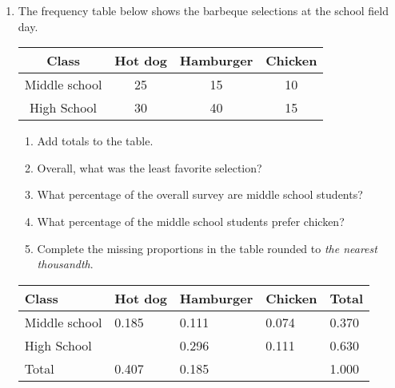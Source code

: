 \documentclass[12pt, twoside]{article}
\begin{document}
\begin{enumerate}[itemsep=0.5cm]
\newpage
\item The frequency table below shows the barbeque selections at the school field day.
    \begin{center}
        \begin{tabular}{|c|c|c|c|}
            \hline
            Class & Hot dog & Hamburger & Chicken \\
            \hline
            Middle school & 25 & 15 & 10 \\[0.25cm]
            \hline
            High School & 30 & 40 & 15 \\[0.25cm]
            \hline
        \end{tabular}
    \end{center} \vspace{1cm}
    \begin{enumerate}
        \item Add totals to the table.
        \item Overall, what was the least favorite selection? \vspace{1cm}
        \item What percentage of the overall survey are middle school students? \vspace{2cm}
        \item What percentage of the middle school students prefer chicken? \vspace{2cm}
        \item Complete the missing proportions in the table rounded to \emph{the nearest thousandth}.
    \end{enumerate}
    \begin{center}
        \begin{tabular}{|p{3cm}|p{2cm}|p{2cm}|p{2cm}|p{2cm}|}
            \hline
            Class & Hot dog & Hamburger & Chicken & \quad Total\\
            \hline
            Middle school & 0.185 & 0.111 & 0.074 & 0.370 \\[0.25cm]
            \hline
            High School &  & 0.296 & 0.111 & 0.630 \\[0.25cm]
            \hline
            Total & 0.407 & 0.185 & & 1.000 \\[0.25cm]
            \hline
        \end{tabular}
    \end{center} 


\end{enumerate}
\end{document}
